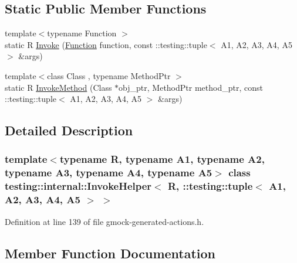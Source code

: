 \subsection*{Static Public Member Functions}
\begin{DoxyCompactItemize}
\item 
{\footnotesize template$<$typename Function $>$ }\\static R \hyperlink{classtesting_1_1internal_1_1InvokeHelper_3_01R_00_01_1_1testing_1_1tuple_3_01A1_00_01A2_00_01A3_00_01A4_00_01A5_01_4_01_4_a1458b05a4c61bc51ae99f586c6d070b8}{Invoke} (\hyperlink{structtesting_1_1internal_1_1Function}{Function} function, const \+::testing\+::tuple$<$ A1, A2, A3, A4, A5 $>$ \&args)
\item 
{\footnotesize template$<$class Class , typename Method\+Ptr $>$ }\\static R \hyperlink{classtesting_1_1internal_1_1InvokeHelper_3_01R_00_01_1_1testing_1_1tuple_3_01A1_00_01A2_00_01A3_00_01A4_00_01A5_01_4_01_4_a5748d33ebff032886c73d88f4b511d87}{Invoke\+Method} (Class $\ast$obj\+\_\+ptr, Method\+Ptr method\+\_\+ptr, const \+::testing\+::tuple$<$ A1, A2, A3, A4, A5 $>$ \&args)
\end{DoxyCompactItemize}


\subsection{Detailed Description}
\subsubsection*{template$<$typename R, typename A1, typename A2, typename A3, typename A4, typename A5$>$\newline
class testing\+::internal\+::\+Invoke\+Helper$<$ R, \+::testing\+::tuple$<$ A1, A2, A3, A4, A5 $>$ $>$}



Definition at line 139 of file gmock-\/generated-\/actions.\+h.



\subsection{Member Function Documentation}
\mbox{\label{classtesting_1_1internal_1_1InvokeHelper_3_01R_00_01_1_1testing_1_1tuple_3_01A1_00_01A2_00_01A3_00_01A4_00_01A5_01_4_01_4_a1458b05a4c61bc51ae99f586c6d070b8}} 
